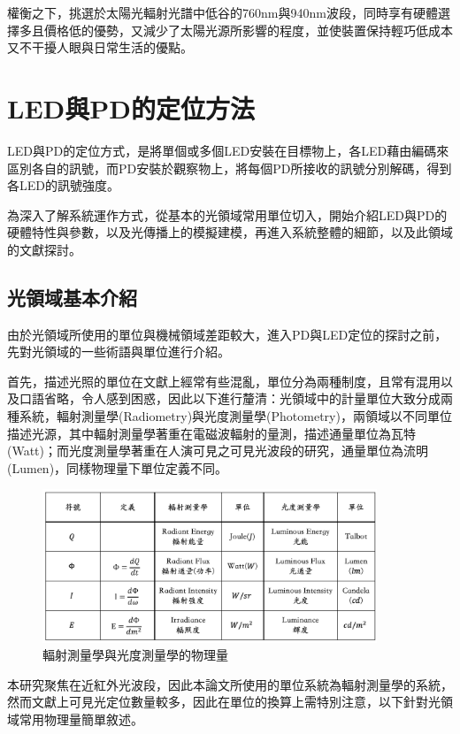         權衡之下，挑選於太陽光輻射光譜中低谷的760nm與940nm波段，同時享有硬體選擇多且價格低的優勢，又減少了太陽光源所影響的程度，並使裝置保持輕巧低成本又不干擾人眼與日常生活的優點。

\section{LED與PD的定位方法}

    LED與PD的定位方式，是將單個或多個LED安裝在目標物上，各LED藉由編碼來區別各自的訊號，而PD安裝於觀察物上，將每個PD所接收的訊號分別解碼，得到各LED的訊號強度。

    為深入了解系統運作方式，從基本的光領域常用單位切入，開始介紹LED與PD的硬體特性與參數，以及光傳播上的模擬建模，再進入系統整體的細節，以及此領域的文獻探討。

    \subsection{光領域基本介紹}
        
        由於光領域所使用的單位與機械領域差距較大，進入PD與LED定位的探討之前，先對光領域的一些術語與單位進行介紹。

        首先，描述光照的單位在文獻上經常有些混亂，單位分為兩種制度，且常有混用以及口語省略，令人感到困惑，因此以下進行釐清：光領域中的計量單位大致分成兩種系統，輻射測量學(Radiometry)與光度測量學(Photometry)，兩領域以不同單位描述光源，其中輻射測量學著重在電磁波輻射的量測，描述通量單位為瓦特(Watt)；而光度測量學著重在人演可見之可見光波段的研究，通量單位為流明(Lumen)，同樣物理量下單位定義不同。\cite{radiometry_and_photometry}
        

        \begin{figure}[ht]
            \centering
            \caption{輻射測量學與光度測量學的物理量}
            \label{tab:photometry}
            \includegraphics[width=10cm]{ch2pic/photometry_table.png}
        \end{figure}


        本研究聚焦在近紅外光波段，因此本論文所使用的單位系統為輻射測量學的系統，然而文獻上可見光定位數量較多，因此在單位的換算上需特別注意，以下針對光領域常用物理量簡單敘述。

